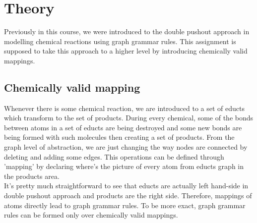 \documentclass[a4paper,10pt,titlepage]{report}
\begin{document}
\section {Theory}

Previously in this course, we were introduced to the double pushout approach in modelling chemical reactions using graph grammar rules. This assignment is supposed to take this approach to a higher level by introducing chemically valid mappings.

\subsection{Chemically valid mapping}

Whenever there is some chemical reaction, we are introduced to a set of educts which transform to the set of products. During every chemical, some of the bonds between atoms in a set of educts are being destroyed and some new bonds are being formed with such molecules then creating a set of products. From the graph level of abstraction, we are just changing the way nodes are connected by deleting and adding some edges. This operations can be defined through 'mapping' by declaring where's the picture of every atom from educts graph in the products area.
\\
It's pretty much straightforward to see that educts are actually left hand-side in double pushout approach and products are the right side. Therefore, mappings of atoms directly lead to graph grammar rules. To be more exact, graph grammar rules can be formed only over chemically valid mappings. 
\end{document}

